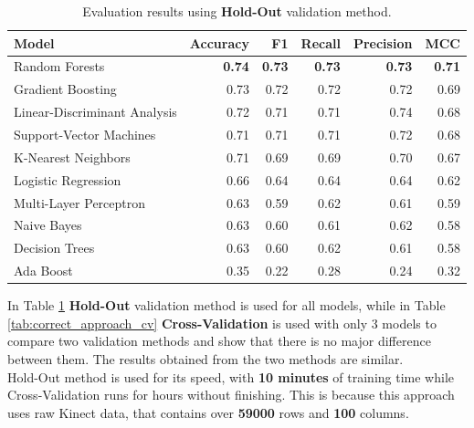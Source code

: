                 \begin{table}[htbp]
                    \centering
                    \caption{Evaluation results using \textbf{Hold-Out} validation method.}
                    \label{tab:correct_approach_holdout}
                    \begin{tabular}{lrrrrr}
                        \toprule
                        \textbf{Model} & \textbf{Accuracy} & \textbf{F1} & \textbf{Recall} & \textbf{Precision} & \textbf{MCC} \\
                        \midrule
                        Random Forests & \textbf{0.74} & \textbf{0.73} & \textbf{0.73} & \textbf{0.73} & \textbf{0.71} \\
                        Gradient Boosting & 0.73 & 0.72 & 0.72 & 0.72 & 0.69 \\
                        Linear-Discriminant Analysis & 0.72 & 0.71 & 0.71 & 0.74 & 0.68 \\
                        Support-Vector Machines & 0.71 & 0.71 & 0.71 & 0.72 & 0.68 \\
                        K-Nearest Neighbors & 0.71 & 0.69 & 0.69 & 0.70 & 0.67 \\
                        Logistic Regression & 0.66 & 0.64 & 0.64 & 0.64 & 0.62 \\
                        Multi-Layer Perceptron & 0.63 & 0.59 & 0.62 & 0.61 & 0.59 \\
                        Naive Bayes & 0.63 & 0.60 & 0.61 & 0.62 & 0.58 \\
                        Decision Trees & 0.63 & 0.60 & 0.62 & 0.61 & 0.58 \\
                        Ada Boost & 0.35 & 0.22 & 0.28 & 0.24 & 0.32 \\
                        \bottomrule
                    \end{tabular}
                \end{table}

                In Table \ref{tab:correct_approach_holdout} \textbf{Hold-Out} validation method is used for all models, while in Table \ref{tab:correct_approach_cv} \textbf{Cross-Validation} is used with only 3 models to compare two validation methods and show that there is no major difference between them. The results obtained from the two methods are similar. \\

                Hold-Out method is used for its speed, with \textbf{10 minutes} of training time while Cross-Validation runs for hours without finishing. This is because this approach uses raw Kinect data, that contains over \textbf{59000} rows and \textbf{100} columns. 
                
